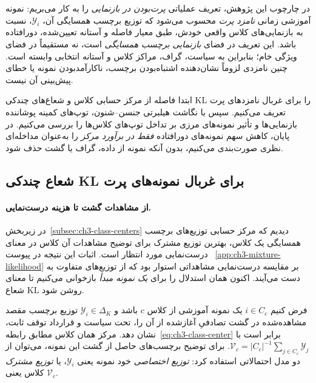 در چارچوب این پژوهش، تعریف
عملیاتی \emph{پرت‌بودن در بازنمایی}
را به کار می‌بریم: نمونه آموزشی
زمانی \emph{نامزد پرت} محسوب
می‌شود که توزیع برچسب همسایگی
آن، $\mathscr Y_i$، نسبت به
بازنمایی‌های کلاس واقعی خودش،
طبق معیار فاصله و آستانه تعیین‌شده،
دورافتاده باشد. این تعریف در
فضای \emph{بازنمایی برچسب همسایگی}
است، نه مستقیماً در فضای ویژگی
خام؛ بنابراین به سیاست، گراف،
مراکز کلاس و آستانه انتخابی
وابسته است. چنین نامزدی لزوماً
نشان‌دهنده اشتباه‌بودن برچسب،
ناکارآمدبودن نمونه یا خطای
پیش‌بینی آن نیست.

ابتدا فاصله از مرکز حسابی کلاس
و شعاع‌های چندکی KL را برای
غربال نامزدهای پرت تعریف می‌کنیم.
سپس با نگاشت هیلبرتی جنسن--شنون،
توپ‌های کمینه پوشاننده بازنمایی‌ها
و تأثیر نمونه‌های مرزی بر تداخل
توپ‌های کلاس‌ها را بررسی می‌کنیم.
در پایان، کاهش سهم نمونه‌های
دورافتاده \emph{فقط در برآورد مرکز}
را به‌عنوان مداخله‌ای نظری
صورت‌بندی می‌کنیم، بدون آنکه
نمونه از داده، گراف یا گشت
حذف شود.

\subsection{شعاع چندکی KL برای غربال نمونه‌های پرت}
\label{subsec:ch3-outlier-quantile-radius}
\paragraph{از مشاهدات گشت تا هزینه درست‌نمایی.}
در زیربخش~\ref{subsec:ch3-class-centers}
دیدیم که مرکز حسابی توزیع‌های
برچسب همسایگی یک کلاس، بهترین
توزیع مشترک برای توضیح مشاهدات
آن کلاس در معنای درست‌نمایی
مورد انتظار است. اثبات این
نتیجه در پیوست~
\ref{app:ch3-mixture-likelihood}
بر مقایسه درست‌نمایی مشاهداتی
استوار بود که از توزیع‌های
متفاوت به دست می‌آیند.
اکنون همان استدلال را برای
\emph{یک نمونه مبدأ} بازخوانی
می‌کنیم تا معنای شعاع KL روشن شود.

فرض کنیم $i\in C_c$ یک نمونه
آموزشی از کلاس $c$ باشد و
$\mathscr Y_i\in\Delta_K$
توزیع برچسب مقصد مشاهده‌شده
در گشت تصادفیِ آغازشده از آن
را، تحت سیاست و قرارداد
توقف ثابت، نشان دهد.
مرکز همان کلاس مطابق
رابطه~\eqref{eq:ch3-class-center}
برابر است با
$\mathcal V_c=|C_c|^{-1}
\sum_{j\in C_c}\mathscr Y_j$.
برای توضیح برچسب‌های حاصل
از گشت این نمونه، می‌توان
از دو مدل احتمالاتی استفاده کرد:
\emph{توزیع اختصاصی} خود نمونه
یعنی $\mathscr Y_i$، یا
\emph{توزیع مشترک} کلاس
یعنی $\mathcal V_c$.


